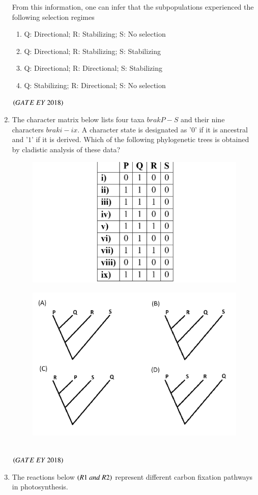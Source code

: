 \documentclass[journal]{IEEEtran}
\numberwithin{equation}{enumi}
\numberwithin{figure}{enumi}
\begin{document}
\begin{enumerate}
\begin{figure}[!ht]
    \caption{}
    \label{fig:6}
   \end{figure}
   From this information, one can infer that the subpopulations experienced the
following selection regimes
\begin{enumerate}
        \item Q: Directional; R: Stabilizing; S: No selection
        \item Q: Directional; R: Stabilizing; S: Stabilizing
        \item Q: Directional; R: Directional; S: Stabilizing
        \item Q: Stabilizing; R: Directional; S: No selection
    \end{enumerate}
    \hfill{$\brak{ GATE\ EY\ 2018}$}
    \bigskip
    \item The character matrix below lists four taxa $brak{P-S}$ and their nine characters $brak{i-ix}$. A
character state is designated as '0' if it is ancestral and '$1$' if it is derived. Which of
the following phylogenetic trees is obtained by cladistic analysis of these data?
    \begin{figure}[!ht]
    \centering
    \includegraphics[width=0.2\columnwidth]{figs/7.png}
    \caption{}
    \label{fig:7}
   \end{figure}
   \begin{figure}[!ht]
    \centering
    \includegraphics[width=0.3\columnwidth]{figs/17.png}
    \caption{}
    \label{fig:17}
   \end{figure}
   \\
    \hfill{$\brak{ GATE\ EY\ 2018}$}
    \bigskip
    
\item The reactions below $\brak{R1\ and\ R2}$ represent different carbon fixation pathways in
photosynthesis.


\end{enumerate}
\end{document}
